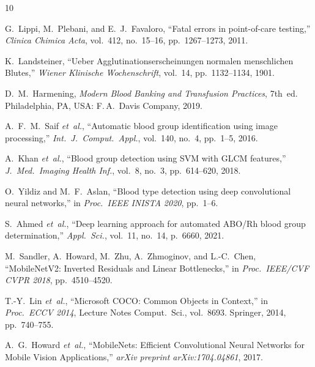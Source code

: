 \documentclass[conference]{IEEEtran}
\begin{document}
\begin{thebibliography}{10}

G.~Lippi, M.~Plebani, and E.~J.~Favaloro,
``Fatal errors in point-of-care testing,''
\emph{Clinica Chimica Acta}, vol.~412, no.~15--16,
pp.~1267--1273, 2011.

K.~Landsteiner,
``Ueber Agglutinationserscheinungen normalen menschlichen Blutes,''
\emph{Wiener Klinische Wochenschrift}, vol.~14,
pp.~1132--1134, 1901.

D.~M.~Harmening,
\emph{Modern Blood Banking and Transfusion Practices},
7th~ed. Philadelphia, PA, USA: F.\,A.~Davis Company, 2019.

A.~F.~M.~Saif \emph{et~al.},
``Automatic blood group identification using image processing,''
\emph{Int.\ J.\ Comput.\ Appl.}, vol.~140, no.~4,
pp.~1--5, 2016.

A.~Khan \emph{et~al.},
``Blood group detection using SVM with GLCM features,''
\emph{J.\ Med.\ Imaging Health Inf.}, vol.~8, no.~3,
pp.~614--620, 2018.

O.~Yildiz and M.~F.~Aslan,
``Blood type detection using deep convolutional neural networks,''
in \emph{Proc.\ IEEE INISTA 2020}, pp.~1--6.

S.~Ahmed \emph{et~al.},
``Deep learning approach for automated ABO/Rh blood group
determination,''
\emph{Appl.\ Sci.}, vol.~11, no.~14, p.~6660, 2021.

M.~Sandler, A.~Howard, M.~Zhu, A.~Zhmoginov, and L.-C.~Chen,
``MobileNetV2: Inverted Residuals and Linear Bottlenecks,''
in \emph{Proc.\ IEEE/CVF CVPR 2018}, pp.~4510--4520.

T.-Y.~Lin \emph{et~al.},
``Microsoft COCO: Common Objects in Context,''
in \emph{Proc.\ ECCV 2014}, Lecture Notes Comput.\ Sci.,
vol.~8693. Springer, 2014, pp.~740--755.

A.~G.~Howard \emph{et~al.},
``MobileNets: Efficient Convolutional Neural Networks for Mobile
Vision Applications,''
\emph{arXiv preprint arXiv:1704.04861}, 2017.

\end{thebibliography}
\end{document}
